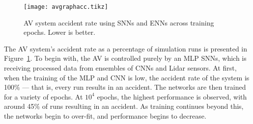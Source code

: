 






\begin{figure}[htb]
	\centering
	\texttt{[image: avgraphacc.tikz]}
	\caption{\ac{AV} system accident rate using \acp{SNN} and \acp{ENN} across training epochs. Lower is better. \label{fig:avaccidents}}
	\vspace{-4mm}
\end{figure}

The \ac{AV} system's accident rate as a percentage of simulation runs is presented in Figure~\ref{fig:avaccidents}.
To begin with, the \ac{AV} is controlled purely by an \ac{MLP} \acp{SNN}, which is receiving processed data from ensembles of \acp{CNN} and Lidar sensors.
At first, when the training of the \ac{MLP} and \ac{CNN} is low, the accident rate of the system is 100\% --- that is, every run results in an accident.
The networks are then trained for a variety of epochs.
At $10^4$ epochs, the highest performance is observed, with around 45\% of runs resulting in an accident.
As training continues beyond this, the networks begin to over-fit, and performance begins to decrease. 

